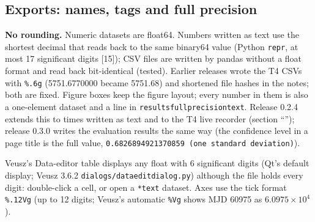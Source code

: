 \documentclass[11pt,a4paper]{article}
\renewcommand{\_}{\usscore\allowbreak}
\begin{document}
\subsection{Exports: names, tags and full precision}\label{sec:exports}
\textbf{No rounding.} Numeric datasets are float64. Numbers written as text use the shortest decimal that
reads back to the same binary64 value (Python \texttt{repr}, at most 17 significant digits [15]); CSV
files are written by pandas without a float format and read back bit-identical (tested). Earlier
releases wrote the T4 CSVs with \texttt{\%.6g} (5751.6770000 became 5751.68) and shortened file hashes
in the notes; both are fixed. Figure boxes keep the figure layout; every number in them is also a
one-element dataset and a line in \texttt{\_results\_full\_precision\_text}. Release 0.2.4 extends
this to times written as text and to the T4 live recorder (section ``'');
release 0.3.0 writes the evaluation results the same way (the confidence level in a page title is the
full value, \texttt{0.6826894921370859 (one standard deviation)}).

Veusz's Data-editor table displays any float with 6 significant digits (Qt's default display; Veusz
3.6.2 \texttt{dialogs/dataeditdialog.py}) although the file holds every digit: double-click a cell,
or open a \texttt{*\_text} dataset. Axes use the tick format \texttt{\%.12Vg} (up to 12 digits;
Veusz's automatic \texttt{\%Vg} shows MJD 60975 as \(6.0975\times10^4\)).
\end{document}
